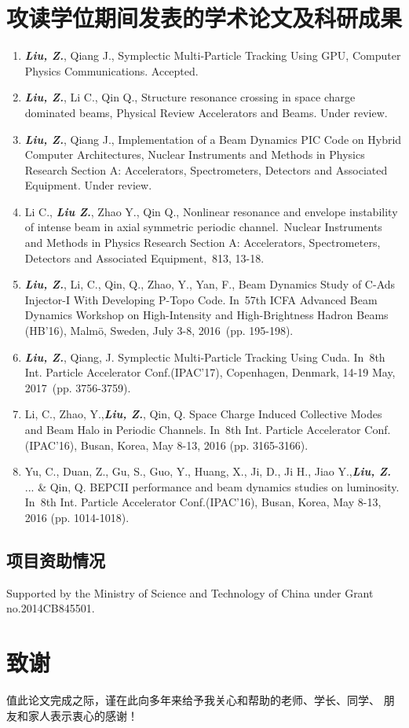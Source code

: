 \chapter{攻读学位期间发表的学术论文及科研成果}
\begin{enumerate}
  \item \textbf{\textit{Liu, Z.}}, Qiang J., Symplectic Multi-Particle Tracking Using GPU, Computer Physics Communications. \color{red}Accepted\color{black}.
  \item \textbf{\textit{Liu, Z.}}, Li C., Qin Q., Structure resonance crossing in space charge dominated beams, Physical Review Accelerators and Beams. \color{red}Under review\color{black}.
  \item \textbf{\textit{Liu, Z.}}, Qiang J., Implementation of a Beam Dynamics PIC Code on Hybrid Computer Architectures, Nuclear Instruments and Methods in Physics Research Section A: Accelerators, Spectrometers, Detectors and Associated Equipment. \color{red}Under review\color{black}.
  \item Li C., \textbf{\textit{Liu Z.}}, Zhao Y., Qin Q., Nonlinear resonance and envelope instability of intense beam in axial symmetric periodic channel. Nuclear Instruments and Methods in Physics Research Section A: Accelerators, Spectrometers, Detectors and Associated Equipment, 813, 13-18.
  \item \textbf{\textit{Liu, Z.}}, Li, C., Qin, Q., Zhao, Y., Yan, F., Beam Dynamics Study of C-Ads Injector-I With Developing P-Topo Code. In 57th ICFA Advanced Beam Dynamics Workshop on High-Intensity and High-Brightness Hadron Beams (HB'16), Malmö, Sweden, July 3-8, 2016 (pp. 195-198).
  \item \textbf{\textit{Liu, Z.}}, Qiang, J. Symplectic Multi-Particle Tracking Using Cuda. In 8th Int. Particle Accelerator Conf.(IPAC'17), Copenhagen, Denmark, 14-19 May, 2017 (pp. 3756-3759).
  \item Li, C., Zhao, Y.,\textbf{\textit{Liu, Z.}},  Qin, Q. Space Charge Induced Collective Modes and Beam Halo in Periodic Channels. In 8th Int. Particle Accelerator Conf.(IPAC'16), Busan, Korea, May 8-13, 2016 (pp. 3165-3166).
  \item Yu, C., Duan, Z., Gu, S., Guo, Y., Huang, X., Ji, D., Ji H., Jiao Y.,\textbf{\textit{Liu, Z.}} ... \& Qin, Q. BEPCII performance and beam dynamics studies on luminosity. In 8th Int. Particle Accelerator Conf.(IPAC'16), Busan, Korea, May 8-13, 2016 (pp. 1014-1018).
\end{enumerate}



\section*{项目资助情况}

Supported by the Ministry of Science and Technology of China under Grant no.2014CB845501.
\chapter{致\quad 谢}

值此论文完成之际，谨在此向多年来给予我关心和帮助的老师、学长、同学、
朋友和家人表示衷心的感谢！


